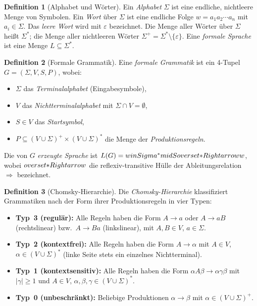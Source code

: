 ﻿\documentclass[a4paper,12pt]{article}
\theoremstyle{definition}
\newtheorem{definition}{Definition}
\begin{document}
\begin{definition}[Alphabet und W\"orter]
Ein \emph{Alphabet} $\Sigma$ ist eine endliche, nichtleere Menge von Symbolen.
Ein \emph{Wort} \"uber $\Sigma$ ist eine endliche Folge $w = a_1 a_2 \cdots a_n$
mit $a_i \in \Sigma$. Das \emph{leere Wort} wird mit $\varepsilon$ bezeichnet.
Die Menge aller W\"orter \"uber $\Sigma$ heißt $\Sigma^*$; die Menge aller
nichtleeren W\"orter $\Sigma^+ = \Sigma^* \setminus \{\varepsilon\}$.
Eine \emph{formale Sprache} ist eine Menge $L \subseteq \Sigma^*$.
\end{definition}

\begin{definition}[Formale Grammatik]
Eine \emph{formale Grammatik} ist ein 4-Tupel $G = (\Sigma, V, S, P)$, wobei:
\begin{itemize}
    \item $\Sigma$ das \emph{Terminalalphabet} (Eingabesymbole),
    \item $V$ das \emph{Nichtterminalalphabet} mit $\Sigma \cap V = \emptyset$,
    \item $S \in V$ das \emph{Startsymbol},
    \item $P \subseteq (V \cup \Sigma)^+ \times (V \cup \Sigma)^*$
          die Menge der \emph{Produktionsregeln}.
\end{itemize}
Die von $G$ \emph{erzeugte Sprache} ist
$L(G) = \\{w \\in \\Sigma^* \\mid S \\overset{*}{\\Rightarrow} w\\}$,
wobei $\\overset{*}{\\Rightarrow}$ die reflexiv-transitive H\"ulle der Ableitungsrelation
$\Rightarrow$ bezeichnet.
\end{definition}

\begin{definition}[Chomsky-Hierarchie]
\label{def:chomsky}
Die \emph{Chomsky-Hierarchie} klassifiziert Grammatiken nach der Form
ihrer Produktionsregeln in vier Typen:
\begin{itemize}
    \item \textbf{Typ~3 (regul\"ar):} Alle Regeln haben die Form
          $A \to a$ oder $A \to aB$ (rechtslinear) bzw.\ $A \to Ba$
          (linkslinear), mit $A, B \in V$, $a \in \Sigma$.
    \item \textbf{Typ~2 (kontextfrei):} Alle Regeln haben die Form
          $A \to \alpha$ mit $A \in V$, $\alpha \in (V \cup \Sigma)^*$
          (linke Seite stets ein einzelnes Nichtterminal).
    \item \textbf{Typ~1 (kontextsensitiv):} Alle Regeln haben die Form
          $\alpha A \beta \to \alpha \gamma \beta$ mit $|\gamma| \geq 1$
          und $A \in V$, $\alpha, \beta, \gamma \in (V \cup \Sigma)^*$.
    \item \textbf{Typ~0 (unbeschr\"ankt):} Beliebige Produktionen
          $\alpha \to \beta$ mit $\alpha \in (V \cup \Sigma)^+$.
\end{itemize}
\end{definition}
\end{document}
